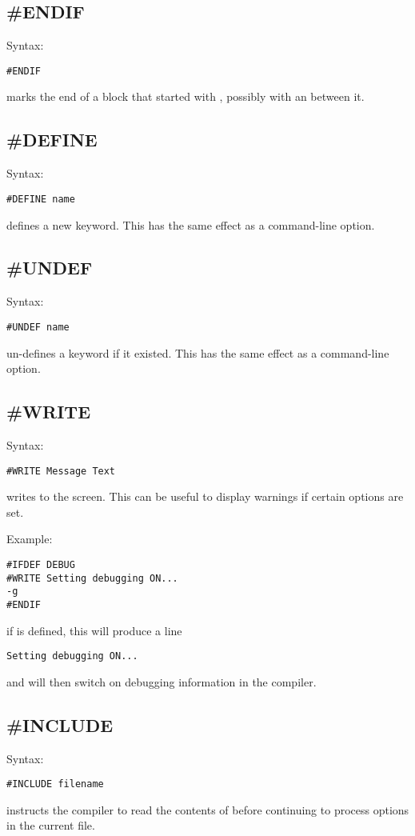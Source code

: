 \subsection{\#ENDIF}
Syntax:
\begin{verbatim}
#ENDIF
\end{verbatim}
 marks the end of a block that started with ,
possibly with an  between it.

\subsection{\#DEFINE}
Syntax:
\begin{verbatim}
#DEFINE name
\end{verbatim}
 defines a new keyword. This has the same effect as a
  command-line option.

\subsection{\#UNDEF}
Syntax:
\begin{verbatim}
#UNDEF name
\end{verbatim}
 un-defines a keyword if it existed.
This has the same effect as a   command-line option.

\subsection{\#WRITE}
Syntax:
\begin{verbatim}
#WRITE Message Text
\end{verbatim}
 writes  to the screen.
This can be useful to display warnings if certain options are set.

Example:
\begin{verbatim}
#IFDEF DEBUG
#WRITE Setting debugging ON...
-g
#ENDIF
\end{verbatim}
if  is defined, this will produce a line
\begin{verbatim}
Setting debugging ON...
\end{verbatim}
and will then switch on debugging information in the compiler.

\subsection{\#INCLUDE}
Syntax:
\begin{verbatim}
#INCLUDE filename
\end{verbatim}
 instructs the compiler to read the contents of
 before continuing to process options in the current file.

